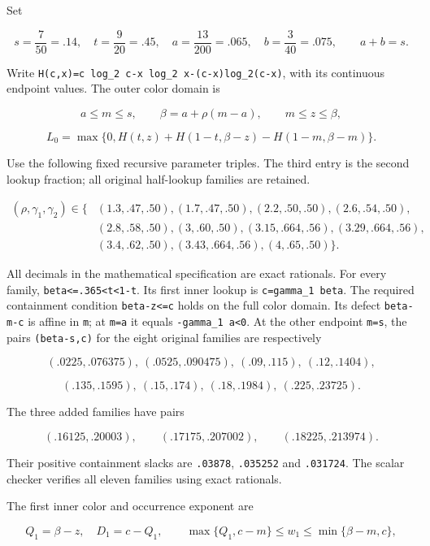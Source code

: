 Set

\[
s=\frac7{50}=.14,\quad t=\frac9{20}=.45,\quad
 a=\frac{13}{200}=.065,\quad b=\frac3{40}=.075,
 \qquad a+b=s.
 \tag{XSS3}
\]

Write \texttt{H(c,x)=c\ log\_2\ c-x\ log\_2\ x-(c-x)log\_2(c-x)}, with its continuous endpoint values. The outer color domain is

\[
a\le m\le s,\qquad \beta=a+\rho(m-a),\qquad m\le z\le\beta,
\]

\[
L_0=\max\{0,H(t,z)+H(1-t,\beta-z)-H(1-m,\beta-m)\}.
 \tag{XSS4}
\]

Use the following fixed recursive parameter triples. The third entry is the second lookup fraction; all original half-lookup families are retained.

\[
\begin{aligned}
(\rho,\gamma_1,\gamma_2)\in\{&
(1.3,.47,.50),(1.7,.47,.50),(2.2,.50,.50),(2.6,.54,.50),\\
&(2.8,.58,.50),(3,.60,.50),(3.15,.664,.56),(3.29,.664,.56),\\
&(3.4,.62,.50),(3.43,.664,.56),(4,.65,.50)\}.
\end{aligned}
\tag{XSS5}
\]

All decimals in the mathematical specification are exact rationals. For every family, \texttt{beta\textless{}=.365\textless{}t\textless{}1-t}. Its first inner lookup is \texttt{c=gamma\_1\ beta}. The required containment condition \texttt{beta-z\textless{}=c} holds on the full color domain. Its defect \texttt{beta-m-c} is affine in \texttt{m}; at \texttt{m=a} it equals \texttt{-gamma\_1\ a\textless{}0}. At the other endpoint \texttt{m=s}, the pairs \texttt{(beta-s,c)} for the eight original families are respectively

\[
(.0225,.076375),\ (.0525,.090475),\ (.09,.115),\ (.12,.1404),
\]

\[
(.135,.1595),\ (.15,.174),\ (.18,.1984),\ (.225,.23725).
\]

The three added families have pairs

\[
(.16125,.20003),\qquad (.17175,.207002),\qquad (.18225,.213974).
\]

Their positive containment slacks are \texttt{.03878}, \texttt{.035252} and \texttt{.031724}. The scalar checker verifies all eleven families using exact rationals.

The first inner color and occurrence exponent are

\[
Q_1=\beta-z,\quad D_1=c-Q_1,\qquad
 \max\{Q_1,c-m\}\le w_1\le\min\{\beta-m,c\},
\]

